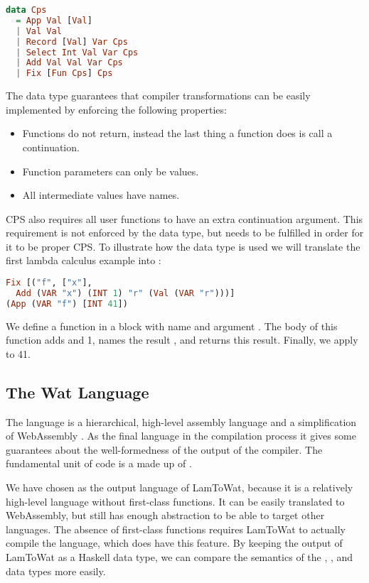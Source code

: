 {\begin{lstlisting}[language=Haskell]
data Cps
  = App Val [Val]
  | Val Val
  | Record [Val] Var Cps
  | Select Int Val Var Cps
  | Add Val Val Var Cps
  | Fix [Fun Cps] Cps
\end{lstlisting}

The  data type guarantees that compiler transformations can be easily implemented by enforcing the following properties:

\begin{itemize}
\item Functions do not return, instead the last thing a function does is call a continuation.
\item Function parameters can only be values.
\item All intermediate values have names.
\end{itemize}

CPS also requires all user functions to have an extra continuation argument. This requirement is not enforced by the data type, but needs to be fulfilled in order for it to be proper CPS. To illustrate how the  data type is used we will translate the first lambda calculus example into :

\begin{lstlisting}[language=Haskell]
Fix [("f", ["x"],
  Add (VAR "x") (INT 1) "r" (Val (VAR "r")))]
(App (VAR "f") [INT 41])
\end{lstlisting}

We define a function in a  block with name  and argument . The body of this function adds  and 1, names the result , and returns this result. Finally, we apply  to 41.

\subsection{\label{subsection:webdata}The Wat Language}
The  language is a hierarchical, high-level assembly language and a simplification of WebAssembly \autocite{webassemblyhomepage}. As the final language in the compilation process it gives some guarantees about the well-formedness of the output of the compiler. The fundamental unit of code is a  made up of .

We have chosen  as the output language of LamToWat, because it is a relatively high-level language without first-class functions. It can be easily translated to WebAssembly, but still has enough abstraction to be able to target other languages. The absence of first-class functions requires LamToWat to actually compile the  language, which does have this feature. By keeping the output of LamToWat as a Haskell data type, we can compare the semantics of the , , and  data types more easily.

}
